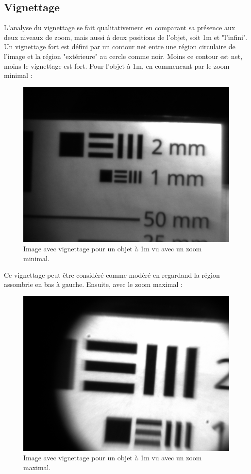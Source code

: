 \documentclass[11pt,letterpaper]{article}
\begin{document}
\subsection{Vignettage}

L'analyse du vignettage se fait qualitativement en comparant sa présence aux deux
niveaux de zoom, mais aussi à deux positions de l'objet, soit 1m et "l'infini". 
Un vignettage fort est défini par un contour net entre une région circulaire de 
l'image et la région "extérieure" au cercle comme noir. Moins ce contour est net, 
moins le vignettage est fort. Pour l'objet à 1m, en commencant par le zoom minimal : 

\begin{figure}[H]
  \centering
  \includegraphics[scale=0.3]{vig_1m_min.png}
  \caption{Image avec vignettage pour un objet à 1m vu avec un zoom minimal.}
  \label{vig_m_min}
\end{figure}

Ce vignettage peut être considéré comme modéré en regardand la région assombrie en 
bas à gauche. Ensuite, avec le zoom maximal :

\begin{figure}[H]
  \centering
  \includegraphics[scale=0.3]{vig_1m_max.png}
  \caption{Image avec vignettage pour un objet à 1m vu avec un zoom maximal.}
  \label{vig_m_max}
\end{figure}
\end{document}
